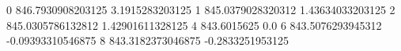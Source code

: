 0 846.7930908203125 3.1915283203125
1 845.0379028320312 1.43634033203125
2 845.0305786132812 1.42901611328125
4 843.6015625 0.0
6 843.5076293945312 -0.09393310546875
8 843.3182373046875 -0.2833251953125
